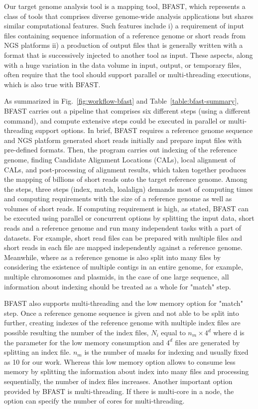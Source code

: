 \documentclass{acm_proc_article-sp}
\begin{document}
Our target genome analysis tool is a mapping tool,
BFAST\cite{bfast2009,bfast2009b}, which represents a class of tools
that comprises diverse genome-wide analysis applications but shares
similar computational features.  Such features include i) a
requirement of input files containing sequence information of a
reference genome or short reads from NGS platforms ii) a production of
output files that is generally written with a format that is
successively injected to another tool as input.  These aspects, along
with a huge variation in the data volume in input, output, or
temporary files, often require that the tool should support parallel
or multi-threading executions, which is also true with
BFAST\cite{bfast2009}.

As summarized in Fig.~\ref{fig:workflow-bfast} and
Table~\ref{table:bfast-summary}, BFAST carries out a pipeline that
comprises six different steps (using a different command), and compute
extensive steps could be executed in parallel or multi-threading
support options.  In brief, BFAST requires a reference genome sequence
and NGS platform generated short reads initially and prepare input
files with pre-defined formats.  Then, the program carries out
indexing of the reference genome, finding Candidate Alignment
Locations (CALs), local alignment of CALs, and post-processing of
alignment results, which taken together produces the mapping of
billions of short reads onto the target reference genome.  Among the
steps, three steps (index, match, loalalign) demands most of computing
times and computing requirements with the size of a reference genome
as well as volumes of short reads.  If computing requirement is high,
as stated, BFAST can be executed using parallel or concurrent options
by splitting the input data, short reads and a reference genome and
run many independent tasks with a part of datasets.  For example,
short read files can be prepared with multiple files and short reads
in each file are mapped independently against a reference genome.
Meanwhile, where as a reference genome is also split into many files
by considering the existence of multiple contigs in an entire genome,
for example, multiple chromosomes and plasmids, in the case of one
large sequence, all information about indexing should be treated as a
whole for "match" step.  


BFAST also supports multi-threading and the low memory option for
"match" step. Once a reference genome sequence is given and not able
to be split into further, creating indexes of the reference genome
with multiple index files are possible resulting the number of the
index files, $N_i$ equal to $n_m \times 4^d$ where d is the parameter
for the low memory consumption and $4^d$ files are generated by
splitting an index file.  $n_m$ is the number of masks for indexing
and usually fixed as 10 for our work.  Whereas this low memory option
allows to consume less memory by splitting the information about index
into many files and processing sequentially, the number of index files
increases.  Another important option provided by BFAST is
multi-threading.  If there is multi-core in a node, the option can
specify the number of cores for multi-threading.
\end{document}
